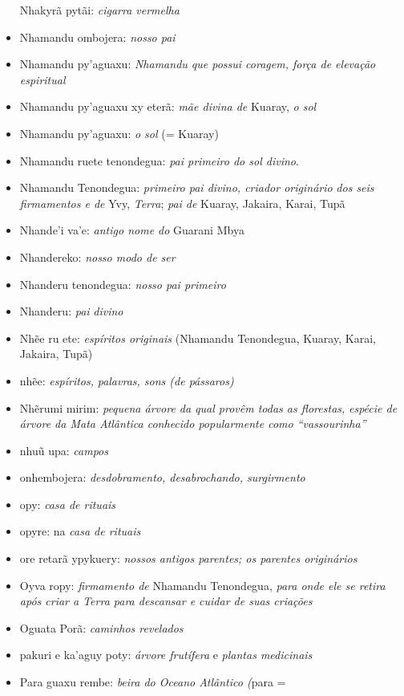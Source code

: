 \begin{itemize}
  Nhakyrã pytãi: \emph{cigarra vermelha}
\item
  Nhamandu ombojera: \emph{nosso pai}
\item
  Nhamandu py'aguaxu: \emph{Nhamandu que possui coragem, força de
  elevação espiritual}
\item
  Nhamandu py'aguaxu xy eterã: \emph{mãe divina de} Kuaray, \emph{o sol}
\item
  Nhamandu py'aguaxu: \emph{o sol} (= Kuaray)
\item
  Nhamandu ruete tenondegua: \emph{pai primeiro do sol divino}.
\item
  Nhamandu Tenondegua: \emph{primeiro pai divino, criador
  originário} \emph{dos seis firmamentos e de} Yvy,
  \emph{Terra}; \emph{pai de} Kuaray,{} Jakaira, Karai, Tupã
\item
  Nhande'i va'e: \emph{antigo nome do} Guarani Mbya
\item
  Nhandereko: \emph{nosso modo de ser}
\item
  Nhanderu tenondegua: \emph{nosso pai primeiro}
\item
  Nhanderu: \emph{pai} \emph{divino}
\item
  Nhẽe ru ete: \emph{espíritos originais} (Nhamandu Tenondegua, Kuaray,
  Karai, Jakaira, Tupã)
\item
  nhẽe: \emph{espíritos,} \emph{palavras, sons (de pássaros)}
\item
  Nhẽrumi mirim: \emph{pequena árvore da qual provêm todas as
  florestas,} \emph{espécie de árvore da Mata Atlântica conhecido
  popularmente como ``vassourinha''}
\item
  nhuũ upa: \emph{campos}
\item
  onhembojera: \emph{desdobramento, desabrochando, surgirmento}
\item
  opy: \emph{casa de rituais}
\item
  opyre: na \emph{casa de rituais}
\item
  ore retarã ypykuery: \emph{nossos antigos parentes; os parentes
  originários}
\item
  Oyva ropy: \emph{firmamento de} Nhamandu Tenondegua, \emph{para onde
  ele se retira após criar a Terra para descansar e cuidar de suas
  criações}
\item
  Oguata Porã: \emph{caminhos revelados}
\item
  pakuri e ka'aguy poty: \emph{árvore frutífera} e \emph{plantas
  medicinais}
\item
  Para guaxu rembe: \emph{beira do Oceano Atlântico (}para =

\end{itemize}
